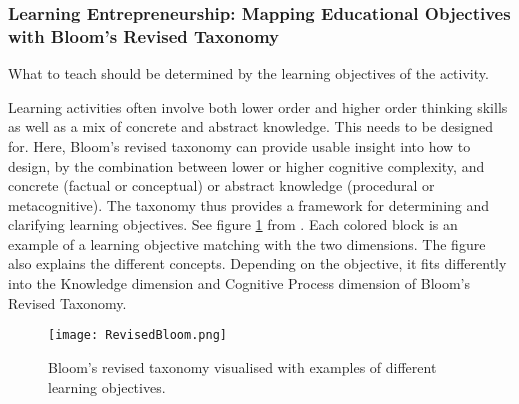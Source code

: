 


%


  \subsubsection{Learning Entrepreneurship: Mapping Educational Objectives with Bloom's Revised Taxonomy}

  What to teach should be determined by the learning objectives of the activity.

  Learning activities often involve both lower order and higher order thinking skills as well as a mix of concrete and abstract knowledge. This needs to be designed for. Here, Bloom's revised taxonomy can provide usable insight into how to design, by the combination between lower or higher cognitive complexity, and concrete (factual or conceptual) or abstract knowledge (procedural or metacognitive). \citep{cheong} The taxonomy thus provides a framework for determining and clarifying learning objectives. See figure \ref{fig:revised-bloom} from \citep{heer}. Each colored block is an example of a learning objective matching with the two dimensions. The figure also explains the different concepts. Depending on the objective, it fits differently into the Knowledge dimension and Cognitive Process dimension of Bloom's Revised Taxonomy. \citep{krathwohl}

  \begin{figure}[h]
    \centering
    \texttt{[image: RevisedBloom.png]}
    \caption{Bloom's revised taxonomy visualised with examples of different learning objectives.}
    \label{fig:revised-bloom}
\end{figure}


